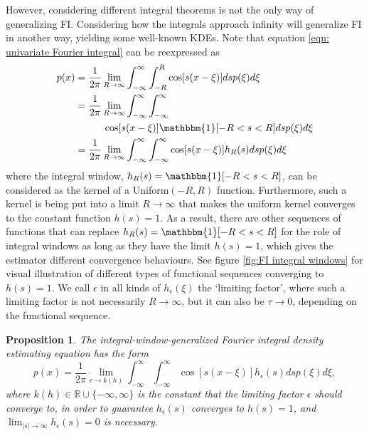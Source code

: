 \documentclass[%
 reprint,
 amsmath,amssymb,
 aps,
]{revtex4-2}
\newtheorem{proposition}[theorem]{Proposition}
\def\R{\mathbb{R}}
\begin{document}
However, considering different integral theorems is not the only way of generalizing FI. Considering how the integrals approach infinity will generalize FI in another way, yielding some well-known KDEs. Note that equation \eqref{eqn: univariate Fourier integral} can be reexpressed as
\begin{align*} 
    p(x) & = \frac{1}{2\pi} \lim_{R \to \infty} \int_{-\infty}^\infty \int_{-R}^R \cos[s(x-\xi)]ds p(\xi)d\xi \\
    & = \frac{1}{2\pi} \lim_{R \to \infty} \int_{-\infty}^\infty \int_{-\infty}^\infty \\
    & \hspace{1cm}\cos[s(x-\xi)] \mathbbm{1}[-R < s < R] ds p(\xi) d\xi \\
    & = \frac{1}{2\pi} \lim_{R \to \infty} \int_{-\infty}^\infty \int_{-\infty}^\infty \cos[s(x-\xi)]h_R(s)ds p(\xi)d\xi
\end{align*}
where the integral window, $h_R(s) = \mathbbm{1}[-R < s < R]$, can be considered as the kernel of a Uniform$(-R, R)$ function. Furthermore, such a kernel is being put into a limit $R \to \infty$ that makes the uniform kernel converges to the constant function $h(s) = 1$. As a result, there are other sequences of functions that can replace $h_R(s) = \mathbbm{1}[-R < s < R]$ for the role of integral windows as long as they have the limit $h(s) = 1$, which gives the estimator different convergence behaviours. See figure \ref{fig:FI integral windows} for visual illustration of different types of functional sequences converging to $h(s) = 1$. We call $\epsilon$ in all kinds of $h_\epsilon(\xi)$ the `limiting factor', where such a limiting factor is not necessarily $R \to \infty$, but it can also be $\tau \to 0$, depending on the functional sequence.
\begin{proposition}
    The integral-window-generalized Fourier integral density estimating equation has the form
    \begin{equation} \label{eqn: integral window h(s)}
        p(x) = \frac{1}{2\pi} \lim_{\epsilon \to k(h)} \int_{-\infty}^\infty \int_{-\infty}^\infty \cos[s(x-\xi)]h_\epsilon(s)ds p(\xi)d\xi,
    \end{equation}
    where $k(h) \in \R \cup \{-\infty, \infty\}$ is the constant that the limiting factor $\epsilon$ should converge to, in order to guarantee $h_\epsilon(s)$ converges to $h(s) = 1$, and $\displaystyle\lim_{|s| \to \infty} h_\epsilon(s) = 0$ is necessary.
\end{proposition}
\end{document}

